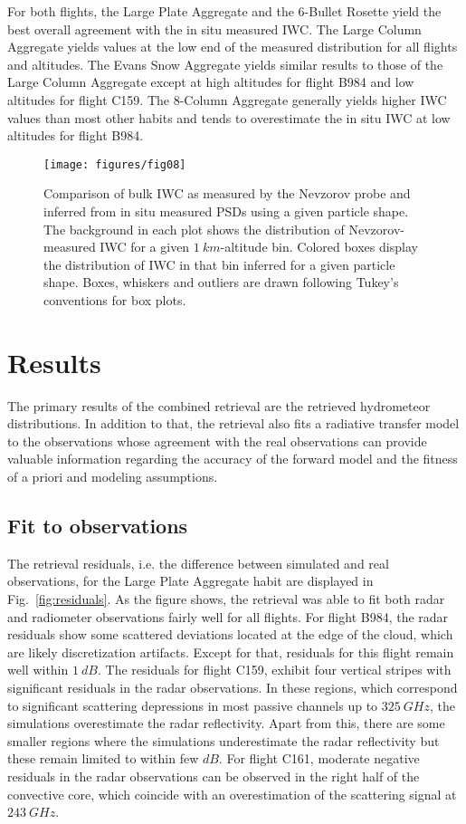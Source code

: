 \documentclass[journal abbreviation, manuscript]{copernicus}
\begin{document}
For both flights, the Large Plate Aggregate and the 6-Bullet Rosette yield
the best overall agreement with the in situ measured IWC. The Large Column
Aggregate yields values at the low end of the measured distribution for all
flights and altitudes. The Evans Snow Aggregate yields similar results to those
of the Large Column Aggregate except at high altitudes for flight B984 and low
altitudes for flight C159. The 8-Column Aggregate generally yields higher IWC
values than most other habits and tends to overestimate the in situ IWC at low
altitudes for flight B984.

\begin{figure}
  \centering
  \texttt{[image: figures/fig08]}
  \caption{ Comparison of bulk IWC as measured by the Nevzorov probe and
    inferred from in situ measured PSDs using a given particle shape. The
    background in each plot shows the distribution of Nevzorov-measured IWC for
    a given $1\ \unit{km}$-altitude bin. Colored boxes display the distribution
    of IWC in that bin inferred for a given particle shape. Boxes, whiskers and
    outliers are drawn following Tukey's conventions for box plots.}
  \label{fig:mass_size_relation}
\end{figure}


\section{Results}
\label{sec:results}

The primary results of the combined retrieval are the retrieved hydrometeor
distributions. In addition to that, the retrieval also fits a radiative transfer
model to the observations whose agreement with the real observations can provide
valuable information regarding the accuracy of the forward model and the fitness
of a priori and modeling assumptions.

\subsection{Fit to observations}

The retrieval residuals, i.e. the difference between simulated and real
observations, for the Large Plate Aggregate habit are displayed in
Fig.~\ref{fig:residuals}. As the figure shows, the retrieval was able to fit
both radar and radiometer observations fairly well for all flights. For flight
B984, the radar residuals show some scattered deviations located at the edge of
the cloud, which are likely discretization artifacts. Except for that, residuals
for this flight remain well within $1\ \unit{dB}$. The residuals for flight
C159, exhibit four vertical stripes with significant residuals in the radar
observations. In these regions, which correspond to significant scattering
depressions in most passive channels up to $325\ \unit{GHz}$, the simulations
overestimate the radar reflectivity. Apart from this, there are some smaller
regions where the simulations underestimate the radar reflectivity but these
remain limited to within few $\unit{dB}$. For flight C161, moderate negative
residuals in the radar observations can be observed in the right half of the
convective core, which coincide with an overestimation of the scattering signal
at $243\ \unit{GHz}$.
\end{document}
